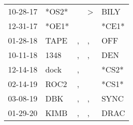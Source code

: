 \begin{supertabular}{lllll}
 10-28-17 &  *OS2* &    &  \textgreater &   BILY \\
 12-31-17 &  *OE1* &    &               &  *CE1* \\
 01-28-18 &   TAPE &  , &             , &    OFF \\
 10-11-18 &   1348 &  , &             , &    DEN \\
 12-14-18 &   dock &  , &               &  *CS2* \\
 02-14-19 &   ROC2 &  , &               &  *CS1* \\
 03-08-19 &    DBK &  , &             , &   SYNC \\
 01-29-20 &   KIMB &  , &             , &   DRAC \\
\end{supertabular}
